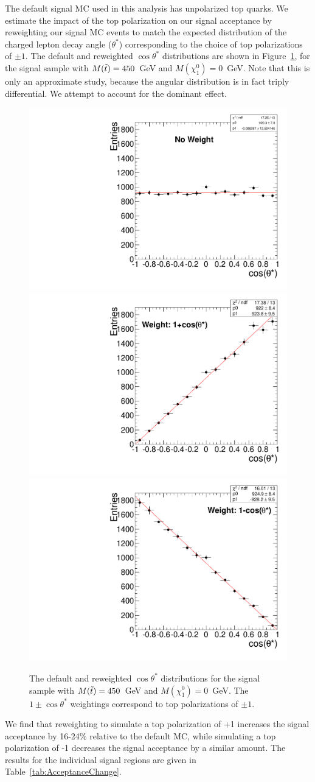 The default signal MC used in this analysis has unpolarized top quarks. We estimate the impact of the top polarization on our signal acceptance by reweighting
our signal MC events to match the expected distribution of the charged lepton decay angle ($\theta^{*}$) corresponding to the choice of top polarizations of $\pm 1$.
The default and reweighted $\cos\theta^{*}$ distributions are shown in Figure~\ref{fig:cosThetaStar}, for the signal sample with $M(\tilde{t})=450$~GeV and $M(\chi_1^0)=0$~GeV.
Note that this is only an approximate study, because the angular distribution is in fact triply differential. We attempt to account for the dominant effect.

\begin{figure}[hbt]
  \begin{center}
	\includegraphics[width=0.325\linewidth]{plots/costheta.pdf}
	\includegraphics[width=0.325\linewidth]{plots/costheta_1p.pdf}
	\includegraphics[width=0.325\linewidth]{plots/costheta_1m.pdf}
	\caption{
	  \label{fig:cosThetaStar}\protect 
          The default and reweighted $\cos\theta^{*}$ distributions for the signal sample with $M(\tilde{t})=450$~GeV and $M(\chi_1^0)=0$~GeV. The $1 \pm \cos\theta^{*}$ weightings correspond to top polarizations of $\pm 1$.}
  \end{center}
\end{figure}

We find that reweighting to simulate a top polarization of +1 increases the signal acceptance by 16-24\% relative to the default MC,
while simulating a top polarization of -1 decreases the signal acceptance by a similar amount. The results for the individual signal regions are given in Table~\ref{tab:AcceptanceChange}.

